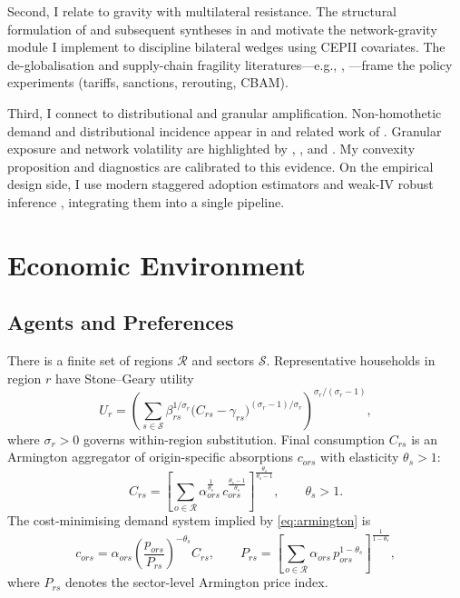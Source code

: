 \documentclass[12pt]{article}
\begin{document}
Second, I relate to gravity with multilateral resistance. The structural formulation of \citet{AndersonVanWincoop2003} and subsequent syntheses in \citet{HeadMayer2014} and \citet{YotovEtAl2016} motivate the network-gravity module I implement to discipline bilateral wedges using CEPII covariates. The de-globalisation and supply-chain fragility literatures---e.g., \citet{Antras2020}, \citet{SforzaSteininger2023}---frame the policy experiments (tariffs, sanctions, rerouting, CBAM).

Third, I connect to distributional and granular amplification. Non-homothetic demand and distributional incidence appear in \citet{FajgelbaumKhandelwal2016} and related work of \citet{FajgelbaumRedding2014}. Granular exposure and network volatility are highlighted by \citet{Gabaix2011}, \citet{diGiovanniLevchenkoMejean2014,diGiovanniLevchenkoMejean2018}, and \citet{AcemogluEtAl2012}. My convexity proposition and diagnostics are calibrated to this evidence. On the empirical design side, I use modern staggered adoption estimators \citep{SunAbraham2021,CallawaySantAnna2021,deChaisemartinDhaultfoeuille2020} and weak-IV robust inference \citep{AndrewsStockSun2019,MontielOleaPflueger2013,StockYogo2005}, integrating them into a single pipeline.

\section{Economic Environment}
\subsection{Agents and Preferences}
There is a finite set of regions $\mathcal{R}$ and sectors $\mathcal{S}$. Representative households in region $r$ have Stone--Geary utility
\begin{equation}
    U_r = \left( \sum_{s\in\mathcal{S}} \beta_{rs}^{1/\sigma_r} \bigl(C_{rs} - \gamma_{rs}\bigr)^{(\sigma_r-1)/\sigma_r} \right)^{\sigma_r/(\sigma_r-1)},
\end{equation}
where $\sigma_r>0$ governs within-region substitution. Final consumption $C_{rs}$ is an Armington aggregator of origin-specific absorptions $c_{ors}$ with elasticity $\theta_s>1$:
\begin{equation}
\label{eq:armington}
C_{rs}
=\left[\sum_{o\in\mathcal{R}}
\alpha_{ors}^{\frac{1}{\theta_s}}
\, c_{ors}^{\frac{\theta_s-1}{\theta_s}}
\right]^{\frac{\theta_s}{\theta_s-1}},\qquad
\theta_s>1.
\end{equation}
The cost-minimising demand system implied by \eqref{eq:armington} is
\begin{equation}
\label{eq:armington-demand}
c_{ors}
=\alpha_{ors}\left(\frac{p_{ors}}{P_{rs}}\right)^{-\theta_s} C_{rs},
\qquad
P_{rs}
=\left[\sum_{o\in\mathcal{R}}
\alpha_{ors}\, p_{ors}^{1-\theta_s}\right]^{\frac{1}{1-\theta_s}},
\end{equation}
where $P_{rs}$ denotes the sector-level Armington price index.
\end{document}
